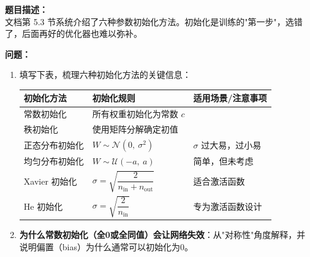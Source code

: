 \documentclass[a4paper,11pt]{ctexart}
\begin{document}
\begin{problembox}
    \textbf{题目描述：}\\
    文档第 5.3 节系统介绍了六种参数初始化方法。初始化是训练的"第一步"，选错了，后面再好的优化器也难以弥补。

    \vspace{0.3cm}
    \textbf{问题：}
    \begin{enumerate}[(1)]
        \item 填写下表，梳理六种初始化方法的关键信息：

        \begin{center}
        \begin{tabular}{p{2.8cm} p{4.5cm} p{4.0cm}}
            \toprule
            初始化方法 & 初始化规则 & 适用场景/注意事项 \\
            \midrule
            常数初始化 & 所有权重初始化为常数 $c$ & \underline{\hspace{3.5cm}} \\[1.2em]
            秩初始化 & 使用\underline{\hspace{2.5cm}}矩阵分解确定初值 & \underline{\hspace{3.5cm}} \\[1.2em]
            正态分布初始化 & $W \sim \mathcal{N}(0,\ \sigma^2)$ & $\sigma$ 过大易\underline{\hspace{1.5cm}}，过小易\underline{\hspace{1.5cm}} \\[1.2em]
            均匀分布初始化 & $W \sim \mathcal{U}(-a,\ a)$ & 简单，但未考虑\underline{\hspace{2.0cm}} \\[1.2em]
            Xavier 初始化 & $\sigma = \sqrt{\dfrac{2}{n_{\text{in}}+n_{\text{out}}}}$ & 适合\underline{\hspace{2.5cm}}激活函数 \\[1.5em]
            He 初始化 & $\sigma = \sqrt{\dfrac{2}{n_{\text{in}}}}$ & 专为\underline{\hspace{2.5cm}}激活函数设计 \\
            \bottomrule
        \end{tabular}
        \end{center}

        \item \textbf{为什么常数初始化（全0或全同值）会让网络失效}：从"对称性"角度解释，并说明偏置（bias）为什么通常可以初始化为0。


\end{enumerate}
\end{problembox}
\end{document}
